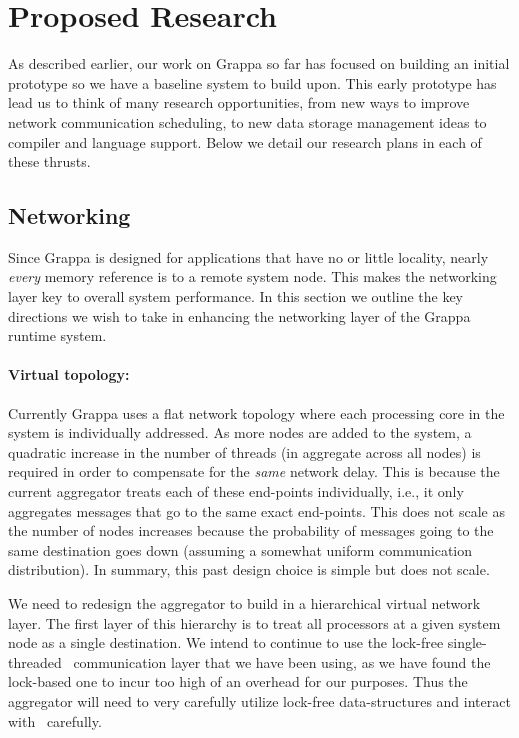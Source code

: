 \section{Proposed Research}

As described earlier, our work on Grappa so far has focused on building an initial prototype so we have a baseline system to build upon. This early prototype has lead us to think of many research opportunities, from new ways to improve network communication scheduling, to new data storage management ideas to compiler and language support. Below we detail our research plans in each of these thrusts. 

\subsection{Networking}

Since Grappa is designed for applications that have no or little locality, nearly \emph{every} memory reference is to a remote system node.  This makes the networking layer key to overall system performance.  In this section we outline the key directions we wish to take in enhancing the networking layer of the Grappa runtime system.

\paragraph{Virtual topology:} Currently Grappa uses a flat network topology where each processing core in the system is individually addressed. As more nodes are added to the system, a quadratic increase in the number of threads (in aggregate across all nodes) is required in order to compensate for the \emph{same} network delay.  This is because the current aggregator treats each of these end-points individually, i.e., it only aggregates messages that go to the same exact end-points. This does not scale as the number of nodes increases because the probability of messages going to the same destination goes down (assuming a somewhat uniform communication distribution). In summary, this past design choice is simple but does not scale.

We need to redesign the aggregator to build in a hierarchical virtual network layer.  The first layer of this hierarchy is to treat all processors at a given system node as a single destination. We intend to continue to use the lock-free single-threaded \gasnet~communication layer that we have been using, as we have found the lock-based one to incur too high of an overhead for our purposes.  Thus the aggregator will need to very carefully utilize lock-free data-structures and interact with \gasnet~carefully.

